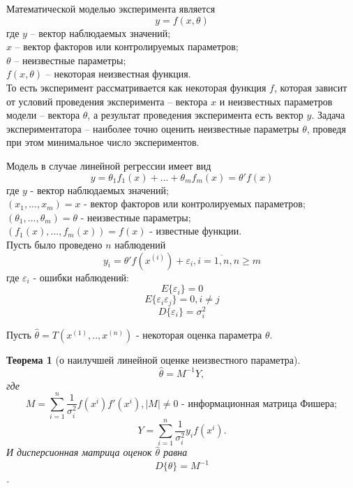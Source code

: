 Математической моделью эксперимента является
\begin{equation}
y = f(x, \theta)  
\end{equation}
где $y$ -- вектор наблюдаемых значений;\\
$x$ -- вектор факторов или контролируемых параметров;\\
$\theta$ -- неизвестные параметры;\\
$f(x, \theta)$ -- некоторая неизвестная функция.\\
То есть эксперимент рассматривается как некоторая функция $f$, которая зависит от условий проведения эксперимента -- вектора $x$ и неизвестных параметров модели -- вектора $\theta$, а результат проведения эксперимента есть вектор $y$. 
Задача экспериментатора -- наиболее точно оценить неизвестные параметры $\theta$, проведя при этом минимальное число экспериментов.

Модель в случае линейной регрессии имеет вид
\begin{equation}
y = \theta_1 f_1(x) +...+ \theta_m f_m(x) = \theta'f(x)
\end{equation}
где $y$ -  вектор наблюдаемых значений;\\
$(x_1,...,x_m)=x$ - вектор факторов или контролируемых параметров;\\
$(\theta_1,...,\theta_m)=\theta$ - неизвестные параметры;\\
$(f_1(x),...,f_m(x))=f(x)$ - известные функции.\\

Пусть было проведено $n$ наблюдений
\begin{equation}
y_i = \theta' f(x^{(i)}) + \varepsilon_i, i = \overline{1, n}, n \ge m
\end{equation}
где $\varepsilon_i$ - ошибки наблюдений:
$$E\{\varepsilon_i\} = 0$$
$$E\{\varepsilon_i \varepsilon_j\} = 0, i \ne j$$
$$D\{\varepsilon_i\}=\sigma_i ^2$$

Пусть $\hat{\theta} =T(x^{(1)},..,x^{(n)}) $ - некоторая оценка параметра $\theta$.\\


\newtheorem{theorem}{Теорема}

\begin{theorem}[о наилучшей линейной оценке неизвестного параметра]
	\begin{equation}
	\hat{\theta} = M^{-1} Y,
	\end{equation}
	где 
	$$M = \sum_{i=1}^{n} \frac{1}{\sigma_i^2}f(x^{i})f'(x^{i}), |M| \ne 0 \text{ - информационная матрица Фишера};$$
	$$Y = \sum_{i=1}^{n}\frac{1}{\sigma_i^2} y_i f(x^{i}).$$
	И дисперсионная матрица оценок $\hat \theta$ равна
	\begin{equation}
		D\{ \hat \theta \}  = M^{-1}
	\end{equation}.
\end{theorem}

